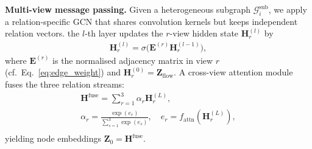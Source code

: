 \textbf{Multi-view message passing.}
Given a heterogeneous subgraph $\mathcal G^{\text{sub}}_{i}$, we apply a relation-specific GCN that shares convolution kernels but keeps independent relation vectors. the $l$-th layer updates the $r$-view hidden state $\mathbf H^{(l)}_r$ by
\begin{equation}
\begin{aligned}
    \mathbf H^{(l)}_r=\sigma\bigl(\mathbf E^{(r)}\mathbf H^{(l-1)}_r\bigr),
\end{aligned}
\end{equation}
where $\mathbf E^{(r)}$ is the normalised adjacency matrix in view $r$ (cf.\ Eq.~\ref{eq:edge_weight}) and $\mathbf H^{(0)}_r=\mathbf Z_{\text{flow}}$. A cross-view attention module fuses the three relation streams:
\begin{equation}
\begin{gathered}
    \mathbf H^{\text{fuse}}=\sum_{r=1}^3 \alpha_r\mathbf H^{(L)}_r,\\
    \alpha_r=\frac{\exp(e_r)}{\sum_{s=1}^3\exp(e_s)}, \quad
    e_r=f_{\text{attn}}\left(\mathbf H^{(L)}_r\right),\\
\end{gathered}
\end{equation}
yielding node embeddings $\mathbf Z_0=\mathbf H^{\text{fuse}}$.

